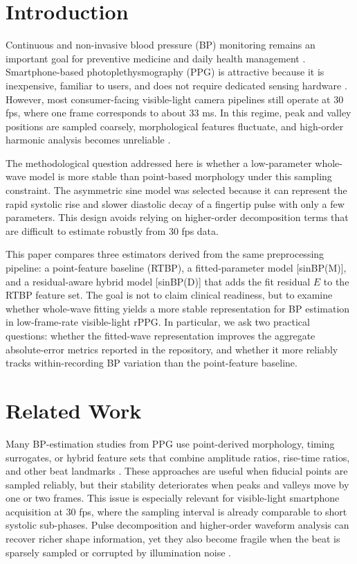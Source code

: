 \documentclass[twocolumn]{svjour3}
\begin{document}
\section{Introduction}
Continuous and non-invasive blood pressure (BP) monitoring remains an important goal for preventive medicine and daily health management \cite{Whelton2018,Sun2016}. Smartphone-based photoplethysmography (PPG) is attractive because it is inexpensive, familiar to users, and does not require dedicated sensing hardware \cite{Sun2016,Verkruysse2008}. However, most consumer-facing visible-light camera pipelines still operate at 30 fps, where one frame corresponds to about 33 ms. In this regime, peak and valley positions are sampled coarsely, morphological features fluctuate, and high-order harmonic analysis becomes unreliable \cite{Millasseau2006,Alian2014,McDuff2014}.

The methodological question addressed here is whether a low-parameter whole-wave model is more stable than point-based morphology under this sampling constraint. The asymmetric sine model was selected because it can represent the rapid systolic rise and slower diastolic decay of a fingertip pulse with only a few parameters. This design avoids relying on higher-order decomposition terms that are difficult to estimate robustly from 30 fps data.

This paper compares three estimators derived from the same preprocessing pipeline: a point-feature baseline (RTBP), a fitted-parameter model [sinBP(M)], and a residual-aware hybrid model [sinBP(D)] that adds the fit residual $E$ to the RTBP feature set. The goal is not to claim clinical readiness, but to examine whether whole-wave fitting yields a more stable representation for BP estimation in low-frame-rate visible-light rPPG. In particular, we ask two practical questions: whether the fitted-wave representation improves the aggregate absolute-error metrics reported in the repository, and whether it more reliably tracks within-recording BP variation than the point-feature baseline.

\section{Related Work}
Many BP-estimation studies from PPG use point-derived morphology, timing surrogates, or hybrid feature sets that combine amplitude ratios, rise-time ratios, and other beat landmarks \cite{Sun2016,Alian2014,Finnegan2023,Fleischhauer2022}. These approaches are useful when fiducial points are sampled reliably, but their stability deteriorates when peaks and valleys move by one or two frames. This issue is especially relevant for visible-light smartphone acquisition at 30 fps, where the sampling interval is already comparable to short systolic sub-phases. Pulse decomposition and higher-order waveform analysis can recover richer shape information, yet they also become fragile when the beat is sparsely sampled or corrupted by illumination noise \cite{Millasseau2006,Allen2007,Hall2020}.
\end{document}
